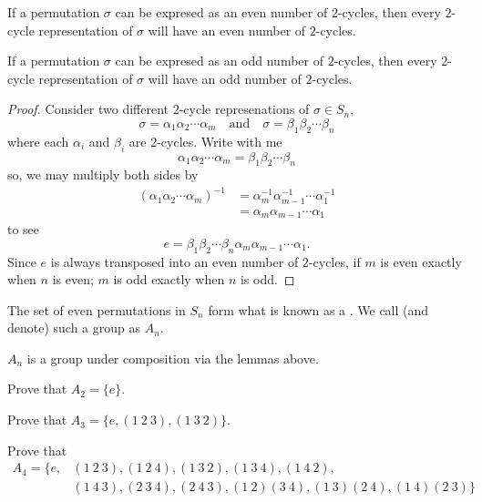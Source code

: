 \documentclass{ximera}
\begin{document}
\begin{lemma}
  If a permutation $\sigma$ can be expresed as an even number of
  $2$-cycles, then every $2$-cycle representation of $\sigma$ will
  have an even number of $2$-cycles.

  If a permutation $\sigma$ can be expresed as an odd number of
  $2$-cycles, then every $2$-cycle representation of $\sigma$ will
  have an odd number of $2$-cycles.
  \begin{proof}
    Consider two different $2$-cycle represenations of $\sigma\in S_n$,
    \[
    \sigma = \alpha_1\alpha_2\cdots\alpha_m \quad\text{and}\quad \sigma = \beta_1\beta_2\cdots\beta_n 
    \]
    where each $\alpha_i$ and $\beta_i$ are $2$-cycles. Write with me
    \[
    \alpha_1\alpha_2\cdots\alpha_m = \beta_1\beta_2\cdots\beta_n
    \]
    so, we may multiply both sides by
    \begin{align*}
    (\alpha_1\alpha_2\cdots\alpha_m)^{-1} &= \alpha_m^{-1}\alpha_{m-1}^{-1}\cdots\alpha_1^{-1}\\
    &= \alpha_m\alpha_{m-1}\cdots\alpha_1
    \end{align*}
    to see
    \[
    e = \beta_1\beta_2\cdots\beta_n\alpha_m\alpha_{m-1}\cdots\alpha_1.
    \]
    Since $e$ is always transposed into an even number of $2$-cycles,
    if $m$ is even exactly when $n$ is even; $m$ is odd exactly when
    $n$ is odd.
  \end{proof}
\end{lemma}






\begin{definition}
  The set of even permutations in $S_n$ form what is known as a
  . We call (and denote) such a group as $A_n$.
\end{definition}

\begin{remark}
  $A_n$ is a group under composition via the lemmas above.
\end{remark}

\begin{exercise}
  Prove that $A_2 = \{e\}$.
\end{exercise}

\begin{exercise}
  Prove that $A_3 = \{e,(1\ 2\ 3), (1\ 3\ 2)\}$.
\end{exercise}

\begin{exercise}
  Prove that
  \begin{align*}
    A_4 =\{e, &(1\ 2\ 3), (1\ 2\ 4), (1\ 3 \ 2), (1\ 3\ 4),  (1\ 4\ 2),  \\
    &(1\ 4\ 3),(2 \ 3 \ 4), (2 \ 4 \ 3), (1\ 2)(3 \ 4), (1\ 3)(2\ 4),(1\ 4)(2\ 3)\}
  \end{align*}
\end{exercise}
\end{document}
